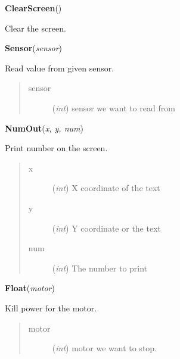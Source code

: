 \documentclass[10pt,a4paper]{article}
\begin{document}
 

\vspace{6pt}
{\bf ClearScreen}({\it }) 
    
    Clear the screen.
    
 

\vspace{6pt}
{\bf Sensor}({\it sensor}) 
    
    Read value from given sensor.
    

    

\begin{quote}
    \begin{description}
        
\item[sensor] ({\emph{int}}) sensor we want to read from

    \end{description}
\end{quote}

 

\vspace{6pt}
{\bf NumOut}({\it x, y, num}) 
    
    Print number on the screen.
 



    

\begin{quote}
    \begin{description}
        
\item[x] ({\emph{int}}) X coordinate of the text

\item[y] ({\emph{int}}) Y coordinate or the text

\item[num] ({\emph{int}}) The number to print

    \end{description}
\end{quote}

 

\vspace{6pt}
{\bf Float}({\it motor}) 
    
    Kill power for the motor.


    

\begin{quote}
    \begin{description}
        
\item[motor] ({\emph{int}}) motor we want to stop.

    \end{description}
\end{quote}
\end{document}
